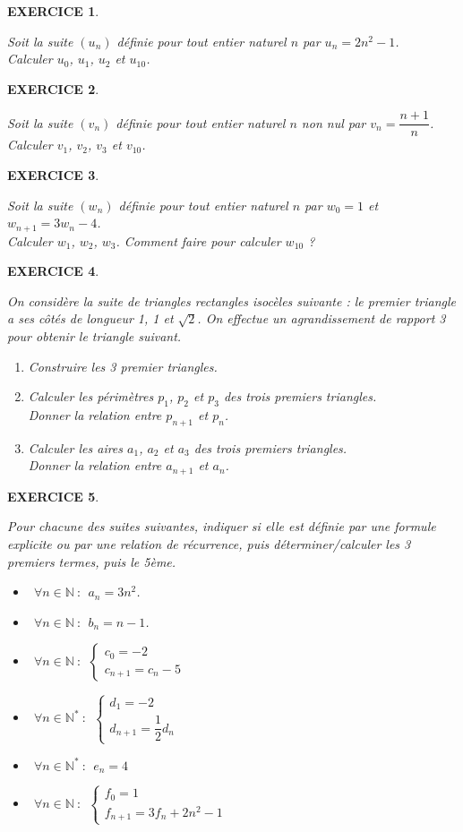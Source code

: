 \documentclass[a4paper]{article}   %
\renewcommand{\(}{\left(}
\renewcommand{\)}{\right)}
\newtheorem{EXO}{\large EXERCICE }
\newenvironment{EX}   { \setcounter{ques}{0} \begin{EXO} \hrulefill ~\vspace{0.3cm}

\normalfont}    {\end{EXO} \medskip}
\newcommand{\f}{\dfrac} 	%
\begin{document}
\begin{EX} Soit la suite $(u_n)$ définie pour tout entier naturel $n$ par $u_n=2n^2-1$. \\
Calculer $u_0$, $u_1$, $u_2$ et $u_{10}$.
\end{EX}
\begin{EX} Soit la suite $(v_n)$ définie pour tout entier naturel $n$ non nul par $v_n=\f{n+1}{n}$. \\
Calculer $v_1$, $v_2$, $v_3$ et $v_{10}$.
\end{EX}
\begin{EX} Soit la suite $(w_n)$ définie pour tout entier naturel $n$ par $w_0=1$ et $w_{n+1}=3w_n-4$. \\
Calculer $w_1$, $w_2$, $w_3$. Comment faire pour calculer $w_{10}$ ?
\end{EX}
\begin{EX} On considère la suite de triangles rectangles isocèles suivante : le premier triangle a ses côtés de longueur 1, 1 et $\sqrt2$. On effectue un agrandissement de rapport 3 pour obtenir le triangle suivant. \begin{enumerate}
\item Construire les 3 premier triangles.
\item Calculer les périmètres $p_1$, $p_2$ et $p_3$ des trois premiers triangles. \\
Donner la relation entre $p_{n+1}$ et $p_n$. 
\item Calculer les aires $a_1$, $a_2$ et $a_3$ des trois premiers triangles. \\
Donner la relation entre $a_{n+1}$ et $a_n$. 
\end{enumerate}
\end{EX}
\begin{EX}Pour chacune des suites suivantes, indiquer si elle est définie par une formule explicite ou par une relation de récurrence, puis déterminer/calculer les 3 premiers termes, puis le 5ème. 
\begin{itemize}
\item[•] $~~\forall n \in \mathbb{N}~:~~a_n=3n^2$.
\item[•] $~~\forall n \in \mathbb{N}~:~~b_n=n-1$.
\item[•] $~~\forall n \in \mathbb{N}~:~~\left \{ \begin{array}{l}
c_0=-2		 \\           			
c_{n+1}=c_n-5	 
\end{array} \right.$
\item[•] $~~\forall n \in \mathbb{N}^*~:~~\left \{ \begin{array}{l}
d_1=-2		 \\           			
d_{n+1}=\f{1}{2}d_n	 
\end{array} \right.$
\item[•] $~~\forall n \in \mathbb{N}^*~:~~e_n=4$
\item[•] $~~\forall n \in \mathbb{N}~:~~\left \{ \begin{array}{l}
f_0=1		 \\           			
f_{n+1}=3f_n+2n^2-1	 
\end{array} \right.$
\end{itemize}
\end{EX}
\end{document}

